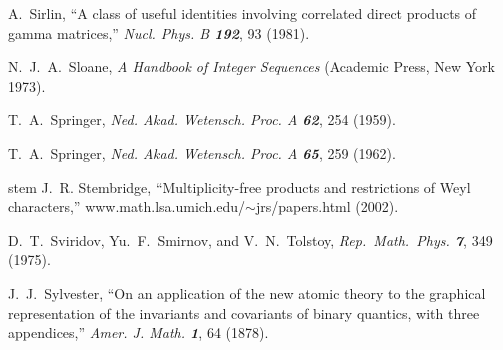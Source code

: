 A.~Sirlin,
``A class of useful identities involving correlated direct products of gamma
matrices,''
{\em Nucl.  Phys.  B  \bf 192}, 93 (1981).


N.~J.~A.~Sloane,
     {\em A Handbook of Integer Sequences}
(Academic Press, New York 1973).

 T.~A.~Springer,
{\em Ned. Akad. Wetensch. Proc.   A \bf 62}, 254 (1959).

 T.~A.~Springer,
{\em Ned. Akad. Wetensch. Proc.   A \bf 65}, 259 (1962).




        {stem} J.~R. Stembridge,
 ``Multiplicity-free products and restrictions of Weyl characters,''
          {www.math.lsa.umich.edu/$\sim$jrs/papers.html} (2002).

 D.~T.~Sviridov, Yu.~F.~Smirnov, and V.~N.~Tolstoy,
{\em Rep.~Math.~Phys.  \bf 7}, 349 (1975).

 J.~J.~Sylvester,
``On an application of the new atomic theory to the graphical
  representation of the invariants and covariants of binary quantics,
  with three appendices,''
{\em  Amer. J. Math. \bf 1}, 64 (1878). %

